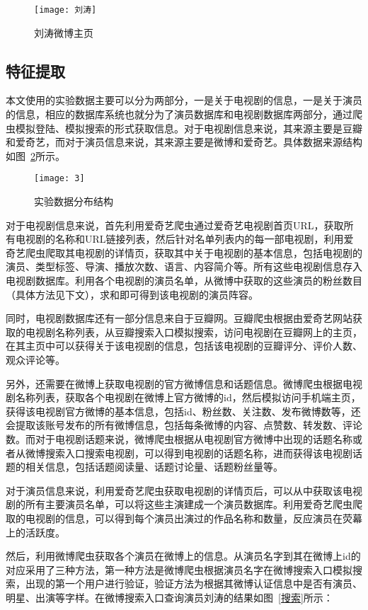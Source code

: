 \begin{figure}[h] 
  \centering
  \texttt{[image: 刘涛]}
  \caption{刘涛微博主页}
  \label{刘涛}
\end{figure}

\subsection{特征提取}

本文使用的实验数据主要可以分为两部分，一是关于电视剧的信息，一是关于演员的信息，相应的数据库系统也就分为了演员数据库和电视剧数据库两部分，通过爬虫模拟登陆、模拟搜索的形式获取信息。对于电视剧信息来说，其来源主要是豆瓣和爱奇艺，而对于演员信息来说，其来源主要是微博和爱奇艺。具体数据来源结构如图~\ref{3}所示。

\begin{figure}[!htbp]
\centering
\texttt{[image: 3]}
\caption{实验数据分布结构}
\label{3}
\end{figure}

对于电视剧信息来说，首先利用爱奇艺爬虫通过爱奇艺电视剧首页URL，获取所有电视剧的名称和URL链接列表，然后针对名单列表内的每一部电视剧，利用爱奇艺爬虫爬取其电视剧的详情页，获取其中关于电视剧的基本信息，包括电视剧的演员、类型标签、导演、播放次数、语言、内容简介等。所有这些电视剧信息存入电视剧数据库。利用各个电视剧的演员名单，从微博中获取的这些演员的粉丝数目（具体方法见下文），求和即可得到该电视剧的演员阵容。

同时，电视剧数据库还有一部分信息来自于豆瓣网。豆瓣爬虫根据由爱奇艺网站获取的电视剧名称列表，从豆瓣搜索入口模拟搜索，访问电视剧在豆瓣网上的主页，在其主页中可以获得关于该电视剧的信息，包括该电视剧的豆瓣评分、评价人数、观众评论等。

另外，还需要在微博上获取电视剧的官方微博信息和话题信息。微博爬虫根据电视剧名称列表，获取各个电视剧在微博上官方微博的id，然后模拟访问手机端主页，获得该电视剧官方微博的基本信息，包括id、粉丝数、关注数、发布微博数等，还会提取该账号发布的所有微博信息，包括每条微博的内容、点赞数、转发数、评论数。而对于电视剧话题来说，微博爬虫根据从电视剧官方微博中出现的话题名称或者从微博搜索入口搜索电视剧，可以得到电视剧的话题名称，进而获得该电视剧话题的相关信息，包括话题阅读量、话题讨论量、话题粉丝量等。

对于演员信息来说，利用爱奇艺爬虫获取电视剧的详情页后，可以从中获取该电视剧的所有主要演员名单，可以将这些主演建成一个演员数据库。利用爱奇艺爬虫爬取的电视剧的信息，可以得到每个演员出演过的作品名称和数量，反应演员在荧幕上的活跃度。

然后，利用微博爬虫获取各个演员在微博上的信息。从演员名字到其在微博上id的对应采用了三种方法，第一种方法是微博爬虫根据演员名字在微博搜索入口模拟搜索，出现的第一个用户进行验证，验证方法为根据其微博认证信息中是否有演员、明星、出演等字样。在微博搜索入口查询演员刘涛的结果如图~\ref{搜索}所示：


